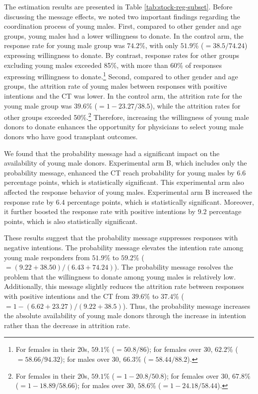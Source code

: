 \documentclass[12pt, a4paper]{article}
\begin{document}
The estimation results are presented in Table \ref{tab:stock-reg-subset}. Before discussing the message effects, we noted two important findings regarding the coordination process of young males. First, compared to other gender and age groups, young males had a lower willingness to donate. In the control arm, the response rate for young male group was \(74.2\)\%, with only \(51.9\)\% (\(=38.5/74.24\)) expressing willingness to donate. By contrast, response rates for other groups excluding young males exceeded 85\%, with more than 60\% of responses expressing willingness to donate.\footnote{For females in their 20s, \(59.1\)\% (\(=50.8/86\)); for females over 30, \(62.2\)\% (\(=58.66/94.32\)); for males over 30, \(66.3\)\% (\(=58.44/88.2\)).} Second, compared to other gender and age groups, the attrition rate of young males between responses with positive intentions and the CT was lower. In the control arm, the attrition rate for the young male group was \(39.6\)\% (\(=1-23.27/38.5\)), while the attrition rates for other groups exceeded 50\%.\footnote{For females in their 20s, \(59.1\)\% (\(=1 - 20.8/50.8\)); for females over 30, \(67.8\)\% (\(=1-18.89/58.66\)); for males over 30, \(58.6\)\% (\(=1-24.18/58.44\)).} Therefore, increasing the willingness of young male donors to donate enhances the opportunity for physicians to select young male donors who have good transplant outcomes.

We found that the probability message had a significant impact on the availability of young male donors. Experimental arm B, which includes only the probability message, enhanced the CT reach probability for young males by \(6.6\) percentage points, which is statistically significant. This experimental arm also affected the response behavior of young males. Experimental arm B increased the response rate by \(6.4\) percentage points, which is statistically significant. Moreover, it further boosted the response rate with positive intentions by \(9.2\) percentage points, which is also statistically significant.

These results suggest that the probability message suppresses responses with negative intentions. The probability message elevates the intention rate among young male responders from \(51.9\)\% to \(59.2\)\% (\(=(9.22+38.50)/(6.43+74.24)\)). The probability message resolves the problem that the willingness to donate among young males is relatively low. Additionally, this message slightly reduces the attrition rate between responses with positive intentions and the CT from \(39.6\)\% to \(37.4\)\% (\(=1-(6.62+23.27)/(9.22+38.5)\)). Thus, the probability message increases the absolute availability of young male donors through the increase in intention rather than the decrease in attrition rate.
\end{document}
